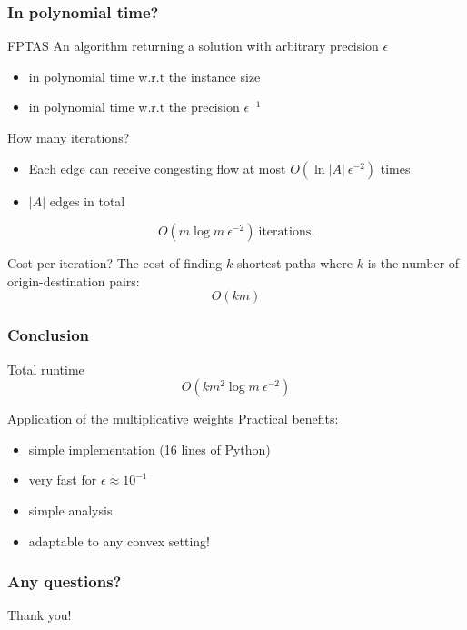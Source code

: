 \documentclass{beamer}
\begin{document}
\begin{frame}
    \frametitle{In polynomial time?}

    \begin{block}{FPTAS}
        An algorithm returning a solution with arbitrary precision $\epsilon$
        \begin{itemize}
            \item in polynomial time w.r.t the instance size
            \item in polynomial time w.r.t the precision $\epsilon^{-1}$
        \end{itemize}
    \end{block}

    \begin{block}{How many iterations?}
        \begin{itemize}
            \item Each edge can receive congesting flow at most
                $O(\ln|A|~\epsilon^{-2})$ times.
            \item $|A|$ edges in total
        \end{itemize}
        \begin{equation*}
        O(m\log m~\epsilon^{-2})~\text{iterations.}
        \end{equation*}
    \end{block}

    \begin{block}{Cost per iteration?}
        The cost of finding $k$ shortest paths where $k$ is the number of
        origin-destination pairs:
        \begin{equation*}
            O(km)
        \end{equation*}
    \end{block}


\end{frame}

\begin{frame}
    \frametitle{Conclusion}

    \begin{block}{Total runtime}
    \begin{equation*}
    O(km^2\log m~\epsilon^{-2})
    \end{equation*}
    \end{block}

    \begin{block}{Application of the multiplicative weights}
        Practical benefits:
        \begin{itemize}
            \item simple implementation (16 lines of Python)
            \item very fast for $\epsilon \approx 10^{-1}$
            \item simple analysis
            \item adaptable to any convex setting!
        \end{itemize}
    \end{block}

\end{frame}

\begin{frame}
    \frametitle{Any questions?}

    \begin{center}
        \huge{Thank you!}
    \end{center}
\end{frame}
\end{document}
